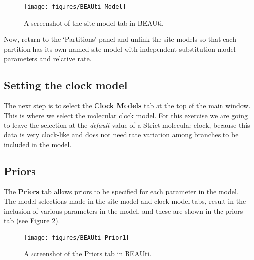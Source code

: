 \documentclass[11pt]{article}
\theoremstyle{plain}%
\theoremstyle{definition}
\theoremstyle{remark}
\begin{document}
\begin{figure}
\texttt{[image: figures/BEAUti\_Model]}
\caption{A screenshot of the site model tab in BEAUti.}
\label{fig:BEAUti_Model}
\end{figure}

Now, return to the `Partitions' panel and unlink the site models so that each partition has its own named site model with independent substitution model parameters and relative rate.

\subsection{Setting the clock model}

The next step is to select the {\bf Clock Models} tab at the top of the
main window. This is where we select the molecular clock model. For this exercise we are going to leave the selection at the {\it default} value of a Strict molecular clock, because this data is very clock-like and does not need rate variation among branches to be included in the model.


\subsection{Priors }

The {\bf Priors} tab allows priors to be specified for each parameter in the
model. The model selections made in the site model and clock model tabs, result in the inclusion of various parameters
in the model, and these are shown in the priors tab (see Figure \ref{fig:BEAUti_Prior1}).

\begin{figure}
\texttt{[image: figures/BEAUti\_Prior1]}
\caption{A screenshot of the Priors tab in BEAUti. }
\label{fig:BEAUti_Prior1}
\end{figure}
\end{document}
